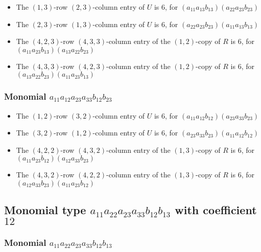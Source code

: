 \documentclass{article}
\begin{document}
\begin{itemize}
\item The $ \left(1, 3\right) $-row $ \left(2, 3\right) $-column entry of $U$ is $ 6 $, for $( a_{11} a_{13} b_{13} )( a_{22} a_{23} b_{23} )$ 
\item The $ \left(2, 3\right) $-row $ \left(1, 3\right) $-column entry of $U$ is $ 6 $, for $( a_{22} a_{23} b_{23} )( a_{11} a_{13} b_{13} )$ 
\item The $(4, 2, 3)$-row $(4, 3, 3)$-column entry of the $ \left(1, 2\right) $-copy of $R$ is $ 6 $, for $( a_{11} a_{23} b_{13} )( a_{13} a_{22} b_{23} )$ 
\item The $(4, 3, 3)$-row $(4, 2, 3)$-column entry of the $ \left(1, 2\right) $-copy of $R$ is $ 6 $, for $( a_{13} a_{22} b_{23} )( a_{11} a_{23} b_{13} )$ 
\end{itemize}
\subsubsection{Monomial $ a_{11} a_{12} a_{23} a_{33} b_{12} b_{23} $}

\begin{itemize}
\item The $ \left(1, 2\right) $-row $ \left(3, 2\right) $-column entry of $U$ is $ 6 $, for $( a_{11} a_{12} b_{12} )( a_{23} a_{33} b_{23} )$ 
\item The $ \left(3, 2\right) $-row $ \left(1, 2\right) $-column entry of $U$ is $ 6 $, for $( a_{23} a_{33} b_{23} )( a_{11} a_{12} b_{12} )$ 
\item The $(4, 2, 2)$-row $(4, 3, 2)$-column entry of the $ \left(1, 3\right) $-copy of $R$ is $ 6 $, for $( a_{11} a_{23} b_{12} )( a_{12} a_{33} b_{23} )$ 
\item The $(4, 3, 2)$-row $(4, 2, 2)$-column entry of the $ \left(1, 3\right) $-copy of $R$ is $ 6 $, for $( a_{12} a_{33} b_{23} )( a_{11} a_{23} b_{12} )$ 
\end{itemize}
\subsection{Monomial type $ a_{11} a_{22} a_{23} a_{33} b_{12} b_{13} $ with coefficient $ 12 $}

\subsubsection{Monomial $ a_{11} a_{22} a_{23} a_{33} b_{12} b_{13} $}
\end{document}
